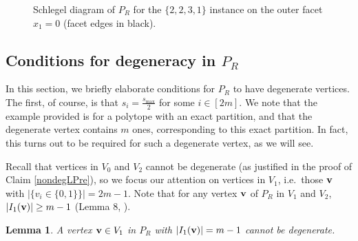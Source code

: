 \documentclass[10pt,a4paper]{amsart}
\newtheorem{lemma}[theorem]{Lemma}
\def\ve#1{\mathchoice{\mbox{\boldmath$\displaystyle\bf#1$}}
{\mbox{\boldmath$\textstyle\bf#1$}}
{\mbox{\boldmath$\scriptstyle\bf#1$}}
{\mbox{\boldmath$\scriptscriptstyle\bf#1$}}}
\begin{document}
\begin{figure}[p]


    \caption{Schlegel diagram of $P_R$ for the $\{2,2,3,1\}$ instance on the outer facet $x_1=0$ (facet edges in black).}
    \label{fig:p2_full}
    \vfill
\end{figure}


\subsection{Conditions for degeneracy in $P_R$}
In this section, we briefly elaborate conditions for $P_R$ to have degenerate vertices. 
The first, of course, is that $s_i = \frac{s_{\max}}{2}$ for some $i \in [2m]$.
We note that the example provided is for a polytope with an exact partition, and that the degenerate vertex contains $m$ ones, corresponding to this exact partition. In fact, this turns out to be required for such a degenerate vertex, as we will see.

Recall that vertices in $V_0$ and $V_2$ cannot be degenerate (as justified in the proof of Claim \ref{nondegLPre}), so we focus our attention on vertices in  $V_1$, i.e.~those $\ve{v}$ with $|\{v_i \in \{0,1\}\}| = 2m-1$. Note that for any vertex $\ve{v}$ of $P_R$ in $V_1$ and $V_2$, $|I_1(\ve{v})|\geq m-1$ (Lemma 8, \cite{NS26}). 


\begin{lemma}
    A vertex $\ve{v}\in V_1$ in $P_R$ with $|I_1(\ve{v})| = m-1$ cannot be degenerate. %
\end{lemma}
\end{document}
